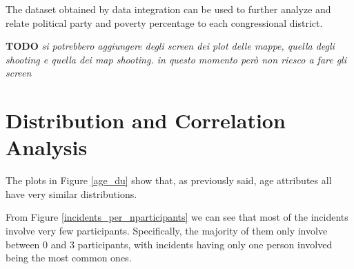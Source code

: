 \documentclass[11pt,a4paper]{report}
\begin{document}
The dataset obtained by data integration can be used to further analyze and relate political party and poverty percentage to each congressional district.

\textbf{TODO} \textit{si potrebbero aggiungere degli screen dei plot delle mappe, quella degli shooting e quella dei map shooting. in questo momento però non riesco a fare gli screen}

\section{Distribution and Correlation Analysis}

The plots in Figure \ref{age_du} show that, as previously said, age attributes all have very similar distributions.

From Figure \ref{incidents_per_nparticipants} we can see that most of the incidents involve very few participants.
Specifically, the majority of them only involve between 0 and 3 participants, with incidents having only one person involved being the most common ones.
\end{document}
